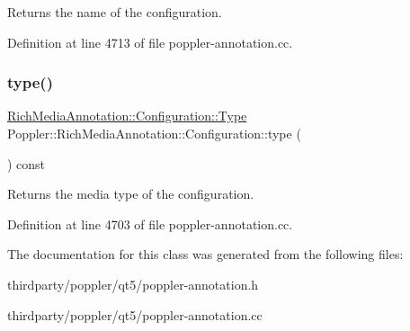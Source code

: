 Returns the name of the configuration. 

Definition at line 4713 of file poppler-\/annotation.\+cc.

\mbox{\label{class_poppler_1_1_rich_media_annotation_1_1_configuration_a70435cb349ad43b0a286d38ab152712a}} 
\subsubsection{\texorpdfstring{type()}{type()}}
{\footnotesize\ttfamily \hyperlink{class_poppler_1_1_rich_media_annotation_1_1_configuration_a1ea5d0aa668b750c50d3c9ae53f31e3b}{Rich\+Media\+Annotation\+::\+Configuration\+::\+Type} Poppler\+::\+Rich\+Media\+Annotation\+::\+Configuration\+::type (\begin{DoxyParamCaption}{ }\end{DoxyParamCaption}) const}

Returns the media type of the configuration. 

Definition at line 4703 of file poppler-\/annotation.\+cc.



The documentation for this class was generated from the following files\+:\begin{DoxyCompactItemize}
\item 
thirdparty/poppler/qt5/poppler-\/annotation.\+h\item 
thirdparty/poppler/qt5/poppler-\/annotation.\+cc\end{DoxyCompactItemize}
